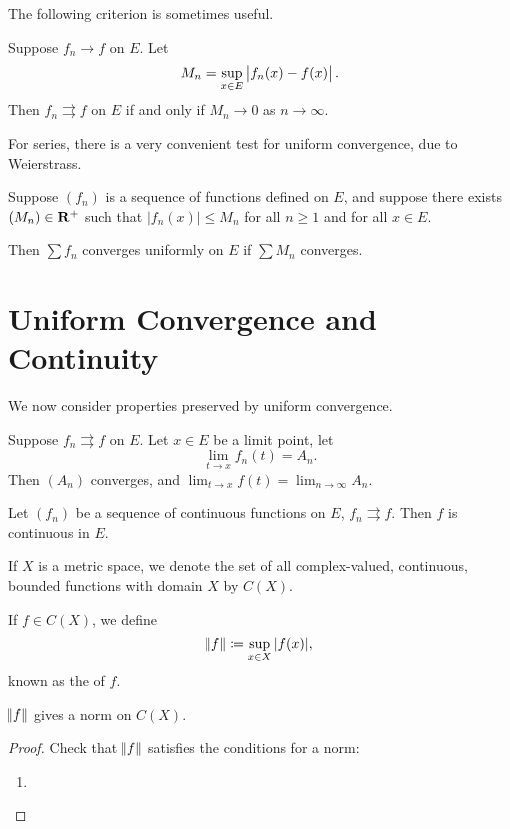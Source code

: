 The following criterion is sometimes useful.

\begin{proposition}
Suppose $f_n\to f$ on $E$. Let
\[M_n=\sup_{x\in E}\left|f_n(x)-f(x)\right|.\]
Then $f_n\rightrightarrows f$ on $E$ if and only if $M_n\to0$ as $n\to\infty$.
\end{proposition}

For series, there is a very convenient test for uniform convergence, due to Weierstrass.

\begin{lemma}
Suppose $(f_n)$ is a sequence of functions defined on $E$, and suppose there exists $(M_n)\in\mathbf R^+$ such that $|f_n(x)|\le M_n$ for all $n\ge1$ and for all $x\in E$.

Then $\sum f_n$ converges uniformly on $E$ if $\sum M_n$ converges.
\end{lemma}

\section{Uniform Convergence and Continuity}
We now consider properties preserved by uniform convergence.

\begin{proposition}
Suppose $f_n\rightrightarrows f$ on $E$. Let $x\in E$ be a limit point, let
\[\lim_{t\to x}f_n(t)=A_n.\]
Then $(A_n)$ converges, and $\displaystyle\lim_{t\to x}f(t)=\lim_{n\to\infty}A_n$.
\end{proposition}

\begin{proposition}
Let $(f_n)$ be a sequence of continuous functions on $E$, $f_n\rightrightarrows f$. Then $f$ is continuous in $E$.
\end{proposition}

\begin{definition}
If $X$ is a metric space, we denote the set of all complex-valued, continuous, bounded functions with domain $X$ by $C(X)$.

If $f\in C(X)$, we define 
\[\norm{f}\coloneqq\sup_{x\in X}|f(x)|,\]
known as the  of $f$.
\end{definition}

\begin{lemma}
$\norm{f}$ gives a norm on $C(X)$.
\end{lemma}

\begin{proof}
Check that $\norm{f}$ satisfies the conditions for a norm:
\begin{enumerate}[label=(\arabic*)]
\item 
\end{enumerate}
\end{proof}

